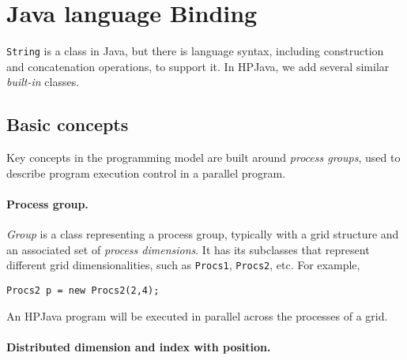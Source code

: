\section{Java language Binding} 

{\tt String} is a class in Java, but there is language syntax, including
construction and concatenation operations, to support it.  In
HPJava, we add several similar \emph{built-in} classes.

\subsection{Basic concepts}

Key concepts in the programming model are built around {\em process
groups}, used to describe program execution control in a parallel
program.

\paragraph{Process group.}
\emph{Group} is a class representing a process group, typically
with a grid structure and an associated set of {\em process
dimensions}.  It has its subclasses that represent different grid
dimensionalities, such as \texttt{Procs1}, \texttt{Procs2}, etc. For example,
\small
\begin{verbatim}
Procs2 p = new Procs2(2,4);
\end{verbatim}
\normalsize
An HPJava program will be executed in parallel across the processes
of a grid. 

\paragraph{Distributed dimension and index with position.}

